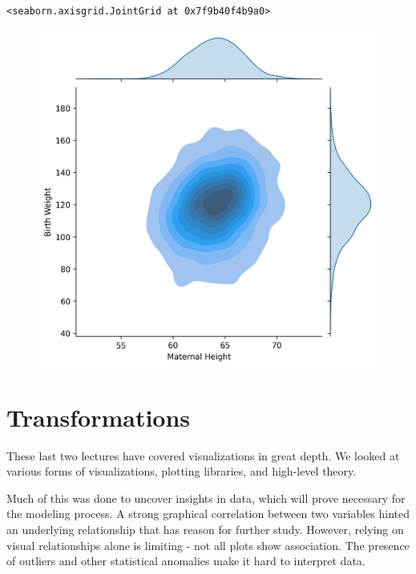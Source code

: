 \documentclass[
  letterpaper,
  DIV=11,
  numbers=noendperiod]{scrreprt}
\begin{document}
\begin{verbatim}
<seaborn.axisgrid.JointGrid at 0x7f9b40f4b9a0>
\end{verbatim}

\begin{figure}[H]

{\centering \includegraphics{visualization_2/visualization_2_files/figure-pdf/cell-12-output-2.png}

}

\end{figure}

\hypertarget{transformations}{%
\section{Transformations}\label{transformations}}

These last two lectures have covered visualizations in great depth. We
looked at various forms of visualizations, plotting libraries, and
high-level theory.

Much of this was done to uncover insights in data, which will prove
necessary for the modeling process. A strong graphical correlation
between two variables hinted an underlying relationship that has reason
for further study. However, relying on visual relationships alone is
limiting - not all plots show association. The presence of outliers and
other statistical anomalies make it hard to interpret data.
\end{document}
